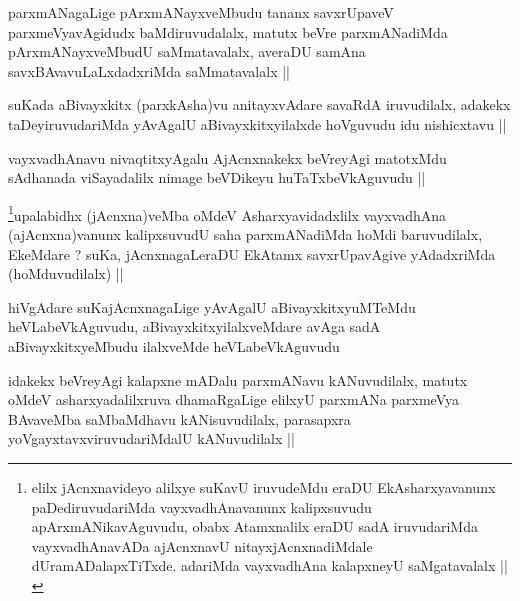 
\begin{artha}
parxmANagaLige pArxmANayxveMbudu tananx savxrUpaveV parxmeVyavAgidudx
baMdiruvudalalx, matutx beVre parxmANadiMda pArxmANayxveMbudU
saMmatavalalx, averaDU samAna savxBAvavuLaLxdadxriMda saMmatavalalx ||
\end{artha}


\begin{artha}
suKada aBivayxkitx (parxkAsha)vu anitayxvAdare savaRdA iruvudilalx,
adakekx taDeyiruvudariMda yAvAgalU aBivayxkitxyilalxde hoVguvudu idu
nishicxtavu ||
\end{artha}


\begin{artha}
vayxvadhAnavu nivaqtitxyAgalu AjAcnxnakekx beVreyAgi matotxMdu
sAdhanada viSayadalilx nimage beVDikeyu huTaTxbeVkAguvudu ||
\end{artha}

\begin{artha}
\footnote{elilx jAcnxnavideyo alilxye suKavU iruvudeMdu eraDU
  EkAsharxyavanunx paDediruvudariMda vayxvadhAnavanunx kalipxsuvudu
  apArxmANikavAguvudu, obabx Atamxnalilx eraDU sadA iruvudariMda
  vayxvadhAnavADa ajAcnxnavU nitayxjAcnxnadiMdale
  dUramADalapxTiTxde. adariMda vayxvadhAna kalapxneyU saMgatavalalx ||}upalabidhx (jAcnxna)veMba oMdeV Asharxyavidadxlilx
  vayxvadhAna (ajAcnxna)vanunx kalipxsuvudU saha parxmANadiMda hoMdi
  baruvudilalx, EkeMdare ? suKa, jAcnxnagaLeraDU EkAtamx
  savxrUpavAgive yAdadxriMda (hoMduvudilalx) ||
\end{artha}


\begin{artha}
hiVgAdare suKajAcnxnagaLige yAvAgalU aBivayxkitxyuMTeMdu
heVLabeVkAguvudu, aBivayxkitxyilalxveMdare avAga sadA
aBivayxkitxyeMbudu ilalxveMde heVLabeVkAguvudu
\end{artha}

\begin{artha}
idakekx beVreyAgi kalapxne mADalu parxmANavu kANuvudilalx, matutx
oMdeV asharxyadalilxruva dhamaRgaLige elilxyU parxmANa parxmeVya
BAvaveMba saMbaMdhavu kANisuvudilalx, parasapxra
yoVgayxtavxviruvudariMdalU kANuvudilalx ||
\end{artha}

